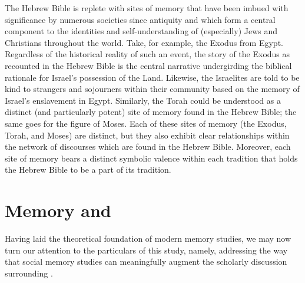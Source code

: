 The Hebrew Bible is replete with sites of memory that have been imbued with significance by numerous societies since antiquity and which form a central component to the identities and self-understanding of (especially) Jews and Christians throughout the world. Take, for example, the Exodus from Egypt. Regardless of the historical reality of such an event, the story of the Exodus as recounted in the Hebrew Bible is the central narrative undergirding the biblical rationale for Israel's possession of the Land. Likewise, the Israelites are told to be kind to strangers and sojourners within their community based on the memory of Israel's enslavement in Egypt. Similarly, the Torah could be understood as a distinct (and particularly potent) site of memory found in the Hebrew Bible; the same goes for the figure of Moses. Each of these sites of memory (the Exodus, Torah, and Moses) are distinct, but they also exhibit clear relationships within the network of discourses which are found in the Hebrew Bible. Moreover, each site of memory bears a distinct symbolic valence within each tradition that holds the Hebrew Bible to be a part of its tradition.

\section{Memory and \rwb}

Having laid the theoretical foundation of modern memory studies, we may now turn our attention to the particulars of this study, namely, addressing the way that social memory studies can meaningfully augment the scholarly discussion surrounding \rwb.%
    \autocite[See also][]{brooke_zsengeller2014}  

